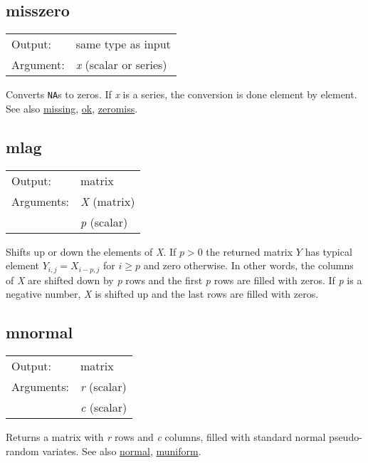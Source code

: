 \subsection{misszero}
\hypertarget{func-misszero}{}

\begin{tabular}{ll}
Output:     & same type as input\\
Argument:   & \textsl{x} (scalar or series)\\
\end{tabular}

	  Converts \texttt{NA}s to zeros. If \textsl{x} is a
	  series, the conversion is done element by element. 
	  See also \hyperlink{func-missing}{missing}, \hyperlink{func-ok}{ok}, \hyperlink{func-zeromiss}{zeromiss}.

\subsection{mlag}
\hypertarget{func-mlag}{}

\begin{tabular}{ll}
Output:     & matrix\\
Arguments:  & \textsl{X} (matrix)\\
           & \textsl{p} (scalar)\\
\end{tabular}

	  Shifts up or down the elements of \textsl{X}. If $p
	  > 0$ the returned matrix $Y$ has typical element $Y_{i,j} =
	  X_{i-p,j}$ for $i \ge p$ and zero otherwise. In other words, the
	  columns of \textsl{X} are shifted down by
	  \textsl{p} rows and the first \textsl{p}
	  rows are filled with zeros. If \textsl{p} is a
	  negative number, \textsl{X} is shifted up and the last
	  rows are filled with zeros.

\subsection{mnormal}
\hypertarget{func-mnormal}{}

\begin{tabular}{ll}
Output:     & matrix\\
Arguments:  & \textsl{r} (scalar)\\
           & \textsl{c} (scalar)\\
\end{tabular}

	  Returns a matrix with \textsl{r} rows and
	  \textsl{c} columns, filled with standard normal
	  pseudo-random variates. 
	  See also \hyperlink{func-normal}{normal}, \hyperlink{func-muniform}{muniform}.

